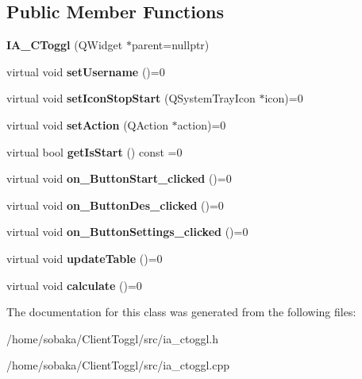 \subsection*{Public Member Functions}
\begin{DoxyCompactItemize}
\item 
\mbox{\label{classIA__CToggl_a895620ac3b480aadcfb121ce0ef8deb9}} 
{\bfseries I\+A\+\_\+\+C\+Toggl} (Q\+Widget $\ast$parent=nullptr)
\item 
\mbox{\label{classIA__CToggl_a2d1e55fac25b89bc9d28562bbe5e08f3}} 
virtual void {\bfseries set\+Username} ()=0
\item 
\mbox{\label{classIA__CToggl_a6ef55429522b80a4230c9071a1803af7}} 
virtual void {\bfseries set\+Icon\+Stop\+Start} (Q\+System\+Tray\+Icon $\ast$icon)=0
\item 
\mbox{\label{classIA__CToggl_ab17a32b5289de754c738aeeba9a65404}} 
virtual void {\bfseries set\+Action} (Q\+Action $\ast$action)=0
\item 
\mbox{\label{classIA__CToggl_ae6bf0f82c6f9187145683202db55df2e}} 
virtual bool {\bfseries get\+Is\+Start} () const =0
\item 
\mbox{\label{classIA__CToggl_a58abfa5a2b49aef8e49c128e598e7edf}} 
virtual void {\bfseries on\+\_\+\+Button\+Start\+\_\+clicked} ()=0
\item 
\mbox{\label{classIA__CToggl_a9a87a5a6fbf5eec3621526535897d3c5}} 
virtual void {\bfseries on\+\_\+\+Button\+Des\+\_\+clicked} ()=0
\item 
\mbox{\label{classIA__CToggl_a54a15558e65195a71b80f711b5be0650}} 
virtual void {\bfseries on\+\_\+\+Button\+Settings\+\_\+clicked} ()=0
\item 
\mbox{\label{classIA__CToggl_af0176914c41807f84dfc55012c4f8ec2}} 
virtual void {\bfseries update\+Table} ()=0
\item 
\mbox{\label{classIA__CToggl_a464e14a8009c786e9dbdfeb64a0e0b19}} 
virtual void {\bfseries calculate} ()=0
\end{DoxyCompactItemize}


The documentation for this class was generated from the following files\+:\begin{DoxyCompactItemize}
\item 
/home/sobaka/\+Client\+Toggl/src/ia\+\_\+ctoggl.\+h\item 
/home/sobaka/\+Client\+Toggl/src/ia\+\_\+ctoggl.\+cpp\end{DoxyCompactItemize}
